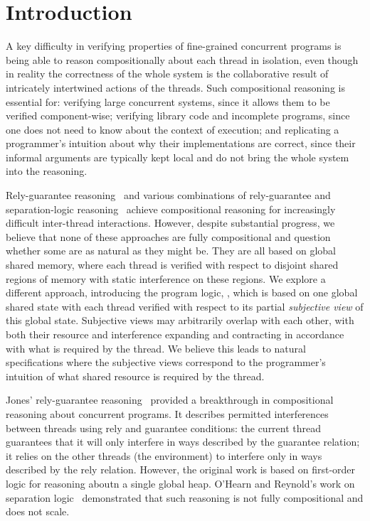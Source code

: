 \section{Introduction}
\label{sec:introduction}



A key difficulty in verifying properties of fine-grained concurrent
programs is being able to reason compositionally about each thread in
isolation, even though in reality the correctness of the whole system
is the collaborative result of intricately intertwined actions of the
threads.  Such compositional reasoning is essential for: verifying
large concurrent systems, since it allows them to be verified
component-wise;  verifying library code and incomplete programs,
since one does not need to know about the context of execution; and 
replicating a programmer's intuition about why their implementations
are correct, since their informal arguments are typically  kept local and do
not bring the whole system into the reasoning.


Rely-guarantee reasoning~\cite{rg} and various combinations of
rely-guarantee and separation-logic
reasoning~\cite{viktor-marriage,dg,lrg,cap-ecoop10,icap,tada} achieve
compositional reasoning for increasingly difficult inter-thread
interactions. However, despite substantial progress, we believe that
none of these approaches are fully compositional and question whether
some are as natural as they might be. They are all based on global
shared memory, where each thread is verified with respect to
disjoint shared regions of memory  with static
interference on these regions. We explore a different approach, introducing the
program logic, \colosl, which is based on one global shared state with
each thread verified with respect to its partial {\em subjective view}
of this global state. Subjective views may arbitrarily overlap with
each other, with both their resource and interference expanding and
contracting  in accordance with what is required by the thread.
We believe this leads to natural  specifications where the subjective
views correspond to the  programmer's intuition of what shared
resource
is required by the thread. 


Jones' rely-guarantee reasoning~\cite{rg} provided a
breakthrough in compositional reasoning about concurrent programs. It
describes permitted interferences between threads using rely and
guarantee conditions: the current thread guarantees that it will only
interfere in ways described by the guarantee relation; it relies on
the other threads (the environment) to interfere only  in ways
described by the rely relation. However, the original work is based on
first-order logic for reasoning aboutn
a single global heap. O'Hearn and Reynold's
work on separation logic~\cite{2001popland john's survey} demonstrated that such reasoning is not
fully compositional and does not scale. 

